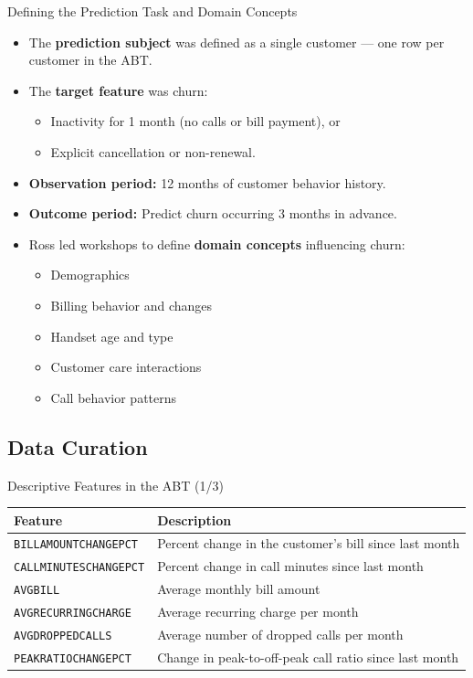 \documentclass[aspectratio=169,xcolor=dvipsnames]{beamer}
\begin{document}
\begin{frame}{Defining the Prediction Task and Domain Concepts}

\begin{itemize}
  \item The \textbf{prediction subject} was defined as a single customer — one row per customer in the ABT.
  \item The \textbf{target feature} was churn:
  \begin{itemize}
    \item Inactivity for 1 month (no calls or bill payment), or
    \item Explicit cancellation or non-renewal.
  \end{itemize}
  \item \textbf{Observation period:} 12 months of customer behavior history.
  \item \textbf{Outcome period:} Predict churn occurring 3 months in advance.
  \item Ross led workshops to define \textbf{domain concepts} influencing churn:
  \begin{itemize}
    \item Demographics
    \item Billing behavior and changes
    \item Handset age and type
    \item Customer care interactions
    \item Call behavior patterns
  \end{itemize}
\end{itemize}

\end{frame}
\subsection{Data Curation}
\begin{frame}{Descriptive Features in the ABT (1/3)}

\begin{tabular}{p{} p{}}
\textbf{Feature} & \textbf{Description} \\
\hline
\texttt{BILLAMOUNTCHANGEPCT} & Percent change in the customer’s bill since last month \\
\texttt{CALLMINUTESCHANGEPCT} & Percent change in call minutes since last month \\
\texttt{AVGBILL} & Average monthly bill amount \\
\texttt{AVGRECURRINGCHARGE} & Average recurring charge per month \\
\texttt{AVGDROPPEDCALLS} & Average number of dropped calls per month \\
\texttt{PEAKRATIOCHANGEPCT} & Change in peak-to-off-peak call ratio since last month \\
\end{tabular}

\end{frame}
\end{document}
